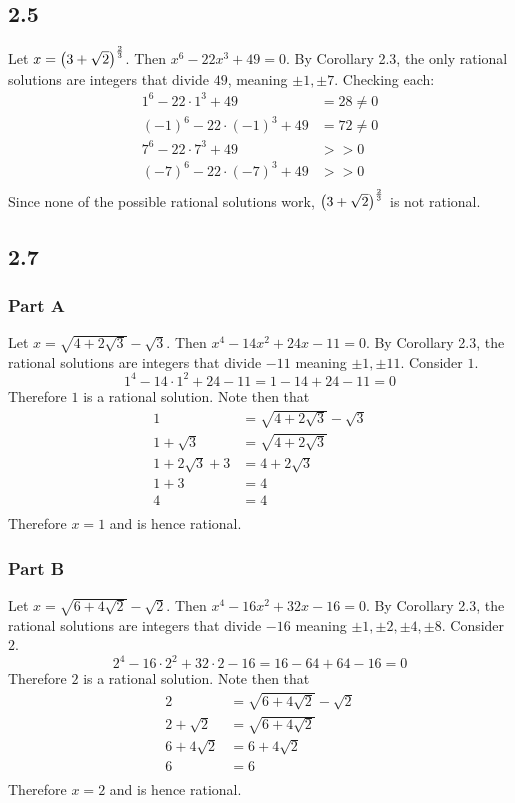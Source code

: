 \documentclass[12pt,titlepage]{extarticle}
\begin{document}
\subsection*{2.5}
Let $x = \qty(3 + \sqrt{2})^{\frac{2}{3}}$. Then $x^6 - 22x^3 + 49 = 0$. By Corollary 2.3, the only rational solutions are integers that divide $49$, meaning $\pm 1, \pm 7$. Checking each:
\begin{align*}
	1^6 - 22 \cdot 1^3 + 49 &= 28 \neq 0 \\
	(-1)^6 - 22 \cdot (-1)^3 + 49 &= 72 \neq 0 \\
	7^6 - 22 \cdot 7^3 + 49 &>> 0 \\
	(-7)^6 - 22 \cdot (-7)^3 + 49 &>> 0 \\
\end{align*}
Since none of the possible rational solutions work, $\qty(3 + \sqrt{2})^{\frac{2}{3}}$ is not rational.

\subsection*{2.7}
\subsubsection*{Part A}
Let $x = \sqrt{4 + 2 \sqrt{3}} - \sqrt{3}$. Then $x^4 - 14x^2 + 24x - 11 = 0$. By Corollary 2.3, the rational solutions are integers that divide $-11$ meaning $\pm 1, \pm 11$. Consider $1$.
\[
	1^4 - 14 \cdot 1^2 + 24 - 11 = 1 - 14 + 24 - 11 = 0
\]
Therefore $1$ is a rational solution. Note then that
\begin{align*}
	1 &= \sqrt{4 + 2 \sqrt{3}} - \sqrt{3} \\
	1 + \sqrt{3} &= \sqrt{4 + 2 \sqrt{3}} \\
	1 + 2\sqrt{3} + 3 &= 4 + 2 \sqrt{3} \\
	1 + 3 &= 4 \\
	4 &= 4 \\
\end{align*}
Therefore $x = 1$ and is hence rational.

\subsubsection*{Part B}
Let $x = \sqrt{6 + 4 \sqrt{2}} - \sqrt{2}$. Then $x^4 - 16x^2  + 32x - 16 = 0$. By Corollary 2.3, the rational solutions are integers that divide $-16$ meaning $\pm 1, \pm 2, \pm 4, \pm 8$. Consider $2$.
\[
	2^4 - 16 \cdot 2^2 + 32 \cdot 2 - 16 = 16 - 64 + 64 - 16 = 0
\]
Therefore $2$ is a rational solution. Note then that
\begin{align*}
	2 &= \sqrt{6 + 4 \sqrt{2}} - \sqrt{2} \\
	2 + \sqrt{2} &= \sqrt{6 + 4 \sqrt{2}} \\
	6 + 4\sqrt{2} &= 6 + 4 \sqrt{2} \\
	6  &= 6  \\
\end{align*}
Therefore $x = 2$ and is hence rational.
\end{document}
